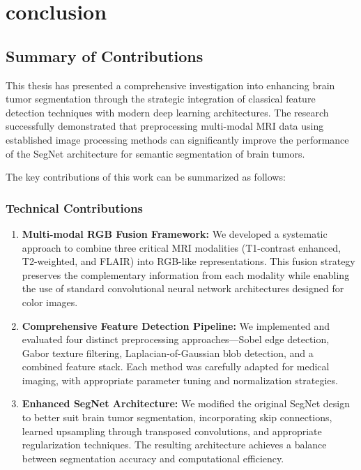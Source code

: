 \chapter{conclusion}
\label{chap:conclusion}

\section{Summary of Contributions}

This thesis has presented a comprehensive investigation into enhancing brain tumor segmentation through the strategic integration of classical feature detection techniques with modern deep learning architectures. The research successfully demonstrated that preprocessing multi-modal MRI data using established image processing methods can significantly improve the performance of the SegNet architecture for semantic segmentation of brain tumors.

The key contributions of this work can be summarized as follows:

\subsection{Technical Contributions}

\begin{enumerate}
    \item \textbf{Multi-modal RGB Fusion Framework:} We developed a systematic approach to combine three critical MRI modalities (T1-contrast enhanced, T2-weighted, and FLAIR) into RGB-like representations. This fusion strategy preserves the complementary information from each modality while enabling the use of standard convolutional neural network architectures designed for color images.
    
    \item \textbf{Comprehensive Feature Detection Pipeline:} We implemented and evaluated four distinct preprocessing approaches—Sobel edge detection, Gabor texture filtering, Laplacian-of-Gaussian blob detection, and a combined feature stack. Each method was carefully adapted for medical imaging, with appropriate parameter tuning and normalization strategies.
    
    \item \textbf{Enhanced SegNet Architecture:} We modified the original SegNet design to better suit brain tumor segmentation, incorporating skip connections, learned upsampling through transposed convolutions, and appropriate regularization techniques. The resulting architecture achieves a balance between segmentation accuracy and computational efficiency.
\end{enumerate}

